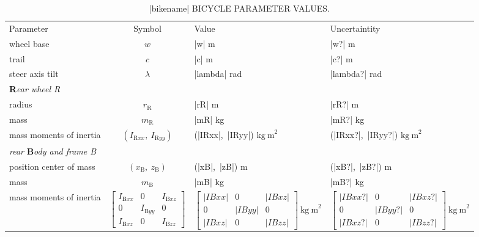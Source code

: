 \documentclass[landscape]{article}
\begin{document}
\begin{table*}[tb]
\centering
\caption{|bikename| BICYCLE PARAMETER VALUES.}
\begin{tabular}{lcll}
&&\\
\hline
Parameter & Symbol & Value & Uncertaintity \\
\hline
wheel base & $w$ & |w| m & |w?| m\\
trail & $c$ & |c| m & |c?| m\\
steer axis tilt & \emph{$\lambda$} & |lambda| rad & |lambda?| rad \\

\multicolumn{3}{l}{\textbf{R}\emph{ear wheel R}}\\
radius & \emph{$r_\mathrm{R}$} & |rR| m & |rR?| m \\
mass & \emph{$m_\mathrm{R}$} & |mR| kg & |mR?| kg\\
mass moments of inertia & \emph{$(I_{\mathrm{R}xx},\
I_{\mathrm{R}yy})$} &
(|IRxx|,\ |IRyy|) $\mathrm{kg\ m}^2$ & (|IRxx?|,\ |IRyy?|) $\mathrm{kg\ m}^2$ \\

\multicolumn{3}{l}{\emph{rear} \textbf{B}\emph{ody and frame B}}\\
position center of mass & \emph{$(x_\mathrm{B},\ z_\mathrm{B})$} &
(|xB|,\ |zB|) m & (|xB?|,\ |zB?|) m \\
mass & \emph{$m_\mathrm{B}$} & |mB| kg & |mB?| kg \\
mass moments of inertia & $\left[ \begin{array}{ccc}
I_{\mathrm{B}xx} &  0 & I_{\mathrm{B}xz}\\
0 & I_{\mathrm{B}yy} & 0 \\
I_{\mathrm{B}xz} & 0 & I_{\mathrm{B}zz}
\end{array} \right] $
&
$\left[ \begin{array}{ccc}
|IBxx| &  0 & |IBxz|\\
0 & |IByy| & 0 \\
|IBxz| & 0 & |IBzz|
\end{array} \right] \ \mathrm{kg\ m}^{2}$
&
$\left[ \begin{array}{ccc}
|IBxx?| &  0 & |IBxz?|\\
0 & |IByy?| & 0 \\
|IBxz?| & 0 & |IBzz?|
\end{array} \right] \ \mathrm{kg\ m}^{2}$\\


\end{tabular}
\end{table*}
\end{document}
